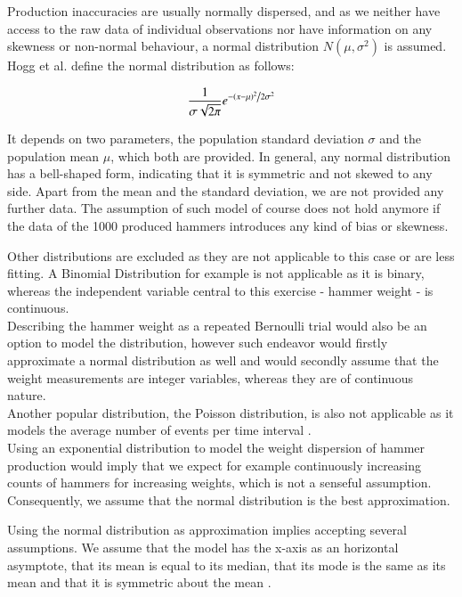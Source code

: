 Production inaccuracies are usually normally dispersed, and as we neither have access to the raw data of individual observations nor have information on any skewness or non-normal behaviour, a normal distribution $N(\mu, \sigma^2)$ is assumed.
Hogg et al. \cite[Definition~3.4.1]{hogg} define the normal distribution as follows: 

\begin{equation} \frac{1}{{\sigma \sqrt {2\pi } }}e^{{{ - \left( {x - \mu } \right)^2 } \mathord{\left/ {\vphantom {{ - \left( {x - \mu } \right)^2 } {2\sigma ^2 }}} \right. \kern-\nulldelimiterspace}{2\sigma ^2 }}}
\label{eq:normaldist}
\end{equation}


It depends on two parameters, the population standard deviation $\sigma$ and the population mean $\mu$, which both are provided. In general, any normal distribution has a bell-shaped form, indicating that it is symmetric and not skewed to any side. Apart from the mean and the standard deviation, we are not provided any further data.  The assumption of such model of course does not hold anymore if the data of the 1000 produced hammers introduces any kind of bias or skewness. 


Other distributions are excluded as they are not applicable to this case or are less fitting. A Binomial Distribution for example is not applicable as it is binary, whereas the independent variable central to this exercise - hammer weight - is continuous. \\Describing the hammer weight as a repeated Bernoulli trial would also be an option to model the distribution, however such endeavor would firstly approximate a normal distribution as well and would secondly assume that the weight measurements are integer variables, whereas they are of continuous nature. \\
Another popular distribution, the Poisson distribution, is also not applicable as it models the average number of events per time interval \cite{bruce2017practical}. \\
Using an exponential distribution to model the weight dispersion of hammer production would imply that we expect for example continuously increasing counts of hammers for increasing weights, which is not a senseful assumption. \\
Consequently, we assume that the normal distribution is the best approximation.

Using the normal distribution as approximation implies accepting several assumptions. We assume that the model has the x-axis as an horizontal asymptote, that its mean is equal to its median, that its mode is the same as its mean and that it is symmetric about the mean \cite[Chapter~3.4]{hogg}.

